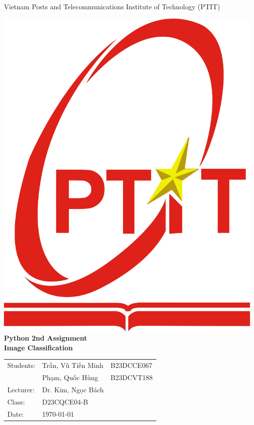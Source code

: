 \documentclass{report}
\begin{document}
\begin{titlepage}
    \center
    \LARGE{Vietnam Posts and Telecommunications Institute of Technology (PTIT)} \\
    \vspace*{\fill}
    
    \includegraphics[scale=0.5]{ptit-logo.png} \\
    \vspace{1cm}
    \huge\textbf{Python 2nd Assignment \\ Image Classification} \\
    \vspace{1cm}

    \Large
    \begin{tabular}{@{}lll@{}}
    Students: & Trần, Vũ Tiến Minh & B23DCCE067 \\
              & Phạm, Quốc Hùng    & B23DCVT188 \\
    Lecturer: & Dr. Kim, Ngọc Bách &            \\
    Class:    & D23CQCE04-B        &            \\
    Date:     & \today             &            \\  
    \end{tabular}

    \vspace{\fill}
\end{titlepage}
\end{document}
